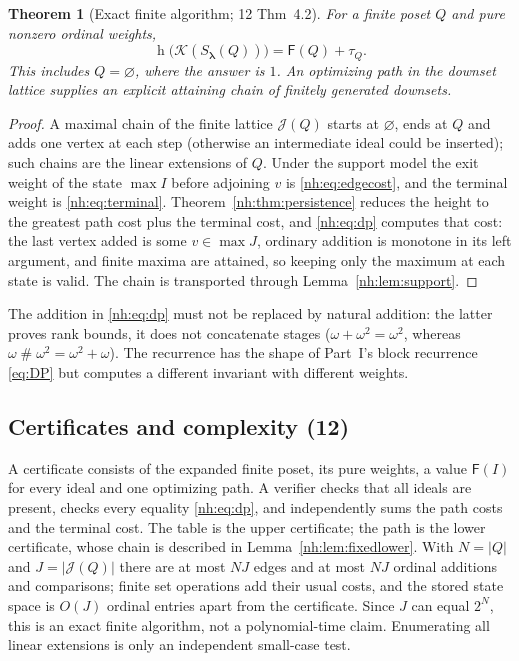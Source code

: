 \documentclass[11pt,a4paper]{article}
\newtheorem{theorem}{Theorem}[section]
\theoremstyle{definition}
\theoremstyle{remark}
\newcommand{\K}{\mathcal K}
\newcommand{\hgt}{\operatorname{h}}
\newcommand{\ns}{\mathbin{\#}}
\newcommand{\J}{\mathcal J}
\newcommand{\Fdp}{\mathsf F}
\begin{document}
\begin{theorem}[Exact finite algorithm; 12 Thm~4.2]\label{nh:thm:dag}
For a finite poset $Q$ and pure nonzero ordinal weights,
\begin{equation}\label{nh:eq:dpheight}
 \boxed{\hgt\bigl(\K(S_{\boldsymbol\lambda}(Q))\bigr)=\Fdp(Q)+\tau_Q.}
\end{equation}
This includes $Q=\varnothing$, where the answer is $1$. An optimizing path in
the downset lattice supplies an explicit attaining chain of finitely generated
downsets.
\end{theorem}
\begin{proof}
A maximal chain of the finite lattice $\J(Q)$ starts at $\varnothing$, ends at
$Q$ and adds one vertex at each step (otherwise an intermediate ideal could be
inserted); such chains are the linear extensions of $Q$. Under the support
model the exit weight of the state $\max I$ before adjoining $v$ is
\eqref{nh:eq:edgecost}, and the terminal weight is \eqref{nh:eq:terminal}.
Theorem~\ref{nh:thm:persistence} reduces the height to the greatest path cost
plus the terminal cost, and \eqref{nh:eq:dp} computes that cost: the last
vertex added is some $v\in\max J$, ordinary addition is monotone in its left
argument, and finite maxima are attained, so keeping only the maximum at each
state is valid. The chain is transported through Lemma~\ref{nh:lem:support}.
\end{proof}

The addition in \eqref{nh:eq:dp} must not be replaced by natural addition: the
latter proves rank bounds, it does not concatenate stages
($\omega+\omega^2=\omega^2$, whereas $\omega\ns\omega^2=\omega^2+\omega$).
The recurrence has the shape of Part~I's block recurrence \eqref{eq:DP} but
computes a different invariant with different weights.

\subsection{Certificates and complexity (12)}\label{nh:sec:dagcert}

A certificate consists of the expanded finite poset, its pure weights, a value
$\Fdp(I)$ for every ideal and one optimizing path. A verifier checks that all
ideals are present, checks every equality \eqref{nh:eq:dp}, and independently
sums the path costs and the terminal cost. The table is the upper certificate;
the path is the lower certificate, whose chain is described in
Lemma~\ref{nh:lem:fixedlower}. With $N=|Q|$ and $J=|\J(Q)|$ there are at most
$NJ$ edges and at most $NJ$ ordinal additions and comparisons; finite set
operations add their usual costs, and the stored state space is $O(J)$ ordinal
entries apart from the certificate. Since $J$ can equal $2^N$, this is an
exact finite algorithm, not a polynomial-time claim. Enumerating all linear
extensions is only an independent small-case test.
\end{document}
